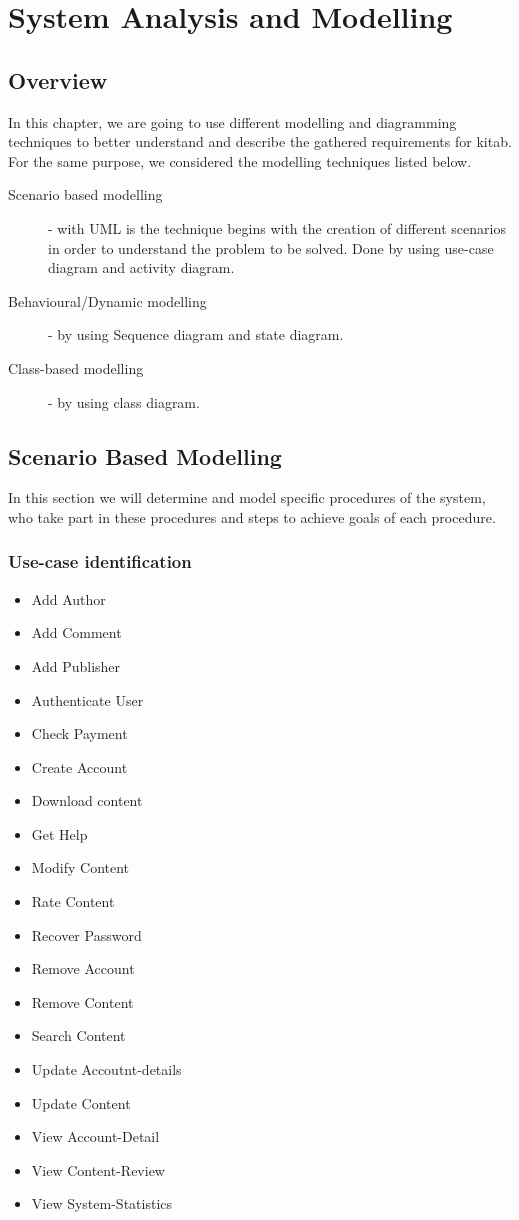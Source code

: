 \chapter{System Analysis and Modelling}
\section{Overview}
In this chapter, we are going to use different modelling and diagramming techniques to better understand and describe
the gathered requirements for kitab. For the same purpose, we considered the modelling techniques listed below.

	\begin{description}
		\item[Scenario based modelling] - with UML is the technique begins with the creation of different scenarios in order to understand the problem to be solved. Done by using use-case diagram and activity diagram.
		\item[Behavioural/Dynamic modelling] - by using Sequence diagram and state diagram.
		\item[Class-based modelling] - by using class diagram.
	\end{description}

\section{Scenario Based Modelling}

In this section we will determine and model specific procedures of the system, who take part in these procedures and steps to achieve goals of each procedure.

	\subsection{Use-case identification}

	\begin{itemize}
		\item Add Author
		\item Add Comment
		\item Add Publisher
		\item Authenticate User
		\item Check Payment
		\item Create Account
		\item Download content
		\item Get Help
		\item Modify Content
		\item Rate Content
		\item Recover Password
		\item Remove Account
		\item Remove Content
		\item Search Content
		\item Update Accoutnt-details
		\item Update Content
		\item View Account-Detail
		\item View Content-Review
		\item View System-Statistics
	\end{itemize}

